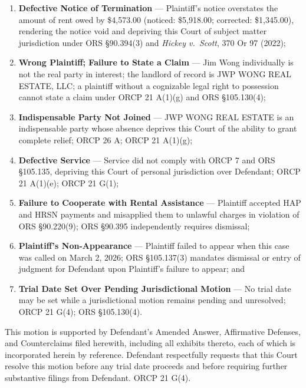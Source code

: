 \documentclass[12pt,letterpaper]{article}
\begin{document}
\begin{enumerate}
  \item \textbf{Defective Notice of Termination} --- Plaintiff's notice overstates the amount of rent owed by \$4,573.00 (noticed: \$5,918.00; corrected: \$1,345.00), rendering the notice void and depriving this Court of subject matter jurisdiction under ORS \S90.394(3) and \textit{Hickey v.\ Scott}, 370 Or 97 (2022);

  \item \textbf{Wrong Plaintiff; Failure to State a Claim} --- Jim Wong individually is not the real party in interest; the landlord of record is JWP WONG REAL ESTATE, LLC; a plaintiff without a cognizable legal right to possession cannot state a claim under ORCP 21 A(1)(g) and ORS \S105.130(4);

  \item \textbf{Indispensable Party Not Joined} --- JWP WONG REAL ESTATE is an indispensable party whose absence deprives this Court of the ability to grant complete relief; ORCP 26 A; ORCP 21 A(1)(g);

  \item \textbf{Defective Service} --- Service did not comply with ORCP 7 and ORS \S105.135, depriving this Court of personal jurisdiction over Defendant; ORCP 21 A(1)(e); ORCP 21 G(1);

  \item \textbf{Failure to Cooperate with Rental Assistance} --- Plaintiff accepted HAP and HRSN payments and misapplied them to unlawful charges in violation of ORS \S90.220(9); ORS \S90.395 independently requires dismissal;

  \item \textbf{Plaintiff's Non-Appearance} --- Plaintiff failed to appear when this case was called on March 2, 2026; ORS \S105.137(3) mandates dismissal or entry of judgment for Defendant upon Plaintiff's failure to appear; and

  \item \textbf{Trial Date Set Over Pending Jurisdictional Motion} --- No trial date may be set while a jurisdictional motion remains pending and unresolved; ORCP 21 G(4); ORS \S105.130(4).
\end{enumerate}

This motion is supported by Defendant's Amended Answer, Affirmative Defenses, and Counterclaims filed herewith, including all exhibits thereto, each of which is incorporated herein by reference. Defendant respectfully requests that this Court resolve this motion before any trial date proceeds and before requiring further substantive filings from Defendant. ORCP 21 G(4).
\end{document}
